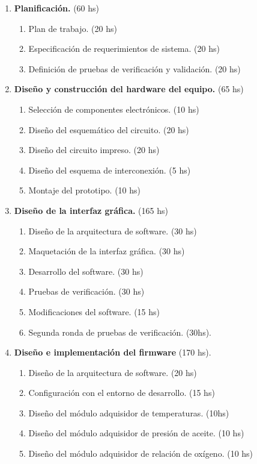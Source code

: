 \documentclass[11pt]{charter}
\begin{document}
\begin{enumerate}
\item \textbf{Planificación.} (60 hs)
	\begin{enumerate}
	\item Plan de trabajo. (20 hs)
	\item Especificación de requerimientos de sistema. (20 hs)
	\item Definición de pruebas de verificación y validación. (20 hs)
	\end{enumerate}
\item \textbf{Diseño y construcción del hardware del equipo.} (65 hs)
	\begin{enumerate}
	\item Selección de componentes electrónicos. (10 hs)
	\item Diseño del esquemático del circuito. (20 hs)
	\item Diseño del circuito impreso. (20 hs)
	\item Diseño del esquema de interconexión. (5 hs)
	\item Montaje del prototipo. (10 hs)
	\end{enumerate}
\item \textbf{Diseño de la interfaz gráfica.} (165 hs)
	\begin{enumerate}
	\item Diseño de la arquitectura de software. (30 hs)
	\item Maquetación de la interfaz gráfica. (30 hs)
	\item Desarrollo del software. (30 hs)
	\item Pruebas de verificación. (30 hs)
	\item Modificaciones del software. (15 hs)
	\item Segunda ronda de pruebas de verificación. (30hs).
	\end{enumerate}
\item \textbf{Diseño e implementación del firmware} (170 hs).
	\begin{enumerate}
	\item Diseño de la arquitectura de software. (20 hs)
	\item Configuración con el entorno de desarrollo. (15 hs)
	\item Diseño del módulo adquisidor de temperaturas. (10hs)
	\item Diseño del módulo adquisidor de presión de aceite. (10 hs)
	\item Diseño del módulo adquisidor de relación de oxígeno. (10 hs)

\end{enumerate}
\end{enumerate}
\end{document}

